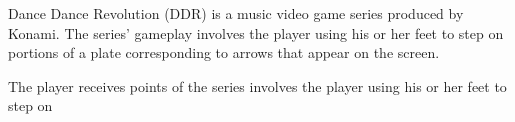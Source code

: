 Dance Dance Revolution (DDR) is a music video game series produced by Konami.
The series' gameplay involves the player using his or her feet to step on portions of a plate corresponding to arrows that appear on the screen.


The player receives points 
of the series involves the player using his or her feet to step on 